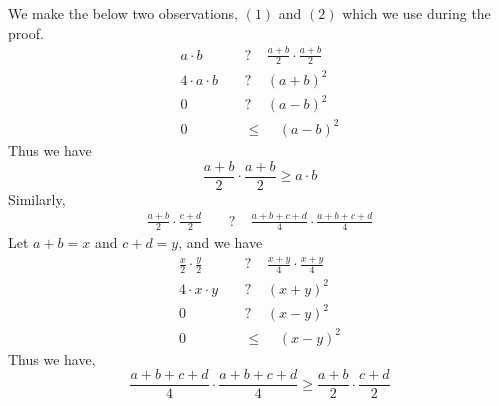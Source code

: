 \documentclass{article}
\begin{document}
We make the below two observations, $(1)$ and $(2)$ which we use during the proof.
\begin{equation*}
	\begin{aligned}
		a \cdot b\ \ \ \ \  &? \ \ \ \ \  \frac{a+b}{2} \cdot \frac{a+b}{2}\\
		4 \cdot a \cdot b\ \ \ \ \ &?\ \ \ \ \ (a+b)^2\\
		0 \ \ \ \ \  &? \ \ \ \ \  (a-b)^2\\
		0 \ \ \ \ \  &\leq \ \ \ \ \  (a-b)^2
	\end{aligned}
\end{equation*}
Thus we have 
\begin{equation}
	\frac{a+b}{2} \cdot \frac{a+b}{2} \geq a \cdot b
\end{equation}
Similarly,
\begin{equation*}
	\begin{aligned}
		\frac{a+b}{2} \cdot \frac{c+d}{2}\ \ \ \ \ &?\ \ \ \ \  \frac{a+b+c+d}{4} \cdot \frac{a+b+c+d}{4}
	\end{aligned}
\end{equation*}
Let $a+b = x$ and $c+d = y$, and we have
\begin{equation*}
	\begin{aligned}
		\frac{x}{2} \cdot \frac{y}{2}\ \ \ \ \ &?\ \ \ \ \  \frac{x+y}{4} \cdot \frac{x+y}{4}\\
		4 \cdot x \cdot y\ \ \ \ \  &?\ \ \ \ \  (x+y)^2\\
		0\ \ \ \ \ &? \ \ \ \ \  (x-y)^2\\
		0\ \ \ \ \ &\leq \ \ \ \ \  (x-y)^2
	\end{aligned}
\end{equation*}
Thus we have,
\begin{equation}
	\frac{a+b+c+d}{4} \cdot \frac{a+b+c+d}{4} \geq \frac{a+b}{2} \cdot \frac{c+d}{2}
\end{equation}
\end{document}
